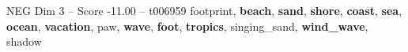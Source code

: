 \begin{textsample}{NEG Dim 3 – Score -11.00 – t006959}  \label{ex:f3_neg_038}
footprint, \textbf{beach}, \textbf{sand}, \textbf{shore}, \textbf{coast}, \textbf{sea}, \textbf{ocean}, \textbf{vacation}, paw, \textbf{wave}, \textbf{foot}, \textbf{tropics}, singing\_sand, \textbf{wind\_wave}, shadow

\end{textsample}
